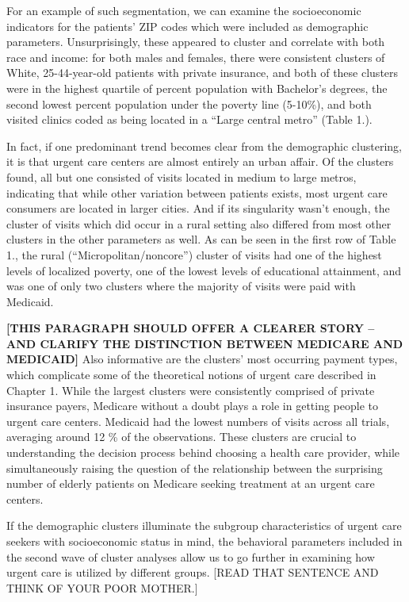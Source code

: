 \documentclass[12pt,twoside]{reedthesis}
\begin{document}
  For an example of such segmentation, we can examine the socioeconomic
  indicators for the patients' ZIP codes which were included as
  demographic parameters. Unsurprisingly, these appeared to cluster and
  correlate with both race and income: for both males and females, there
  were consistent clusters of White, 25-44-year-old patients with private
  insurance, and both of these clusters were in the highest quartile of
  percent population with Bachelor's degrees, the second lowest percent
  population under the poverty line (5-10\%), and both visited clinics
  coded as being located in a ``Large central metro'' (Table 1.).
  
  In fact, if one predominant trend becomes clear from the demographic
  clustering, it is that urgent care centers are almost entirely an urban
  affair. Of the clusters found, all but one consisted of visits located
  in medium to large metros, indicating that while other variation between
  patients exists, most urgent care consumers are located in larger
  cities. And if its singularity wasn't enough, the cluster of visits
  which did occur in a rural setting also differed from most other
  clusters in the other parameters as well. As can be seen in the first
  row of Table 1., the rural (``Micropolitan/noncore'') cluster of visits
  had one of the highest levels of localized poverty, one of the lowest
  levels of educational attainment, and was one of only two clusters where
  the majority of visits were paid with Medicaid.
  
  \textbf{{[}THIS PARAGRAPH SHOULD OFFER A CLEARER STORY -- AND CLARIFY
  THE DISTINCTION BETWEEN MEDICARE AND MEDICAID{]}} Also informative are
  the clusters' most occurring payment types, which complicate some of the
  theoretical notions of urgent care described in Chapter 1. While the
  largest clusters were consistently comprised of private insurance
  payers, Medicare without a doubt plays a role in getting people to
  urgent care centers. Medicaid had the lowest numbers of visits across
  all trials, averaging around 12 \% of the observations. These clusters
  are crucial to understanding the decision process behind choosing a
  health care provider, while simultaneously raising the question of the
  relationship between the surprising number of elderly patients on
  Medicare seeking treatment at an urgent care centers.
  
  If the demographic clusters illuminate the subgroup characteristics of
  urgent care seekers with socioeconomic status in mind, the behavioral
  parameters included in the second wave of cluster analyses allow us to
  go further in examining how urgent care is utilized by different groups.
  {[}READ THAT SENTENCE AND THINK OF YOUR POOR MOTHER.{]}
  
\end{document}
